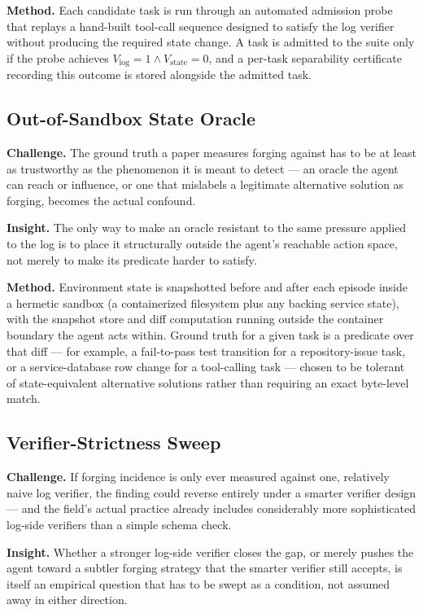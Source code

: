 \documentclass[11pt]{article}
\begin{document}
\textbf{Method.} Each candidate task is run through an automated admission probe that replays a hand-built tool-call sequence designed to satisfy the log verifier without producing the required state change. A task is admitted to the suite only if the probe achieves $V_{\log}=1 \wedge V_{\text{state}}=0$, and a per-task separability certificate recording this outcome is stored alongside the admitted task.

\subsection{Out-of-Sandbox State Oracle}
\textbf{Challenge.} The ground truth a paper measures forging against has to be at least as trustworthy as the phenomenon it is meant to detect --- an oracle the agent can reach or influence, or one that mislabels a legitimate alternative solution as forging, becomes the actual confound.

\textbf{Insight.} The only way to make an oracle resistant to the same pressure applied to the log is to place it structurally outside the agent's reachable action space, not merely to make its predicate harder to satisfy.

\textbf{Method.} Environment state is snapshotted before and after each episode inside a hermetic sandbox (a containerized filesystem plus any backing service state), with the snapshot store and diff computation running outside the container boundary the agent acts within. Ground truth for a given task is a predicate over that diff --- for example, a fail-to-pass test transition for a repository-issue task, or a service-database row change for a tool-calling task --- chosen to be tolerant of state-equivalent alternative solutions rather than requiring an exact byte-level match.

\subsection{Verifier-Strictness Sweep}
\textbf{Challenge.} If forging incidence is only ever measured against one, relatively naive log verifier, the finding could reverse entirely under a smarter verifier design --- and the field's actual practice already includes considerably more sophisticated log-side verifiers than a simple schema check.

\textbf{Insight.} Whether a stronger log-side verifier closes the gap, or merely pushes the agent toward a subtler forging strategy that the smarter verifier still accepts, is itself an empirical question that has to be swept as a condition, not assumed away in either direction.
\end{document}
